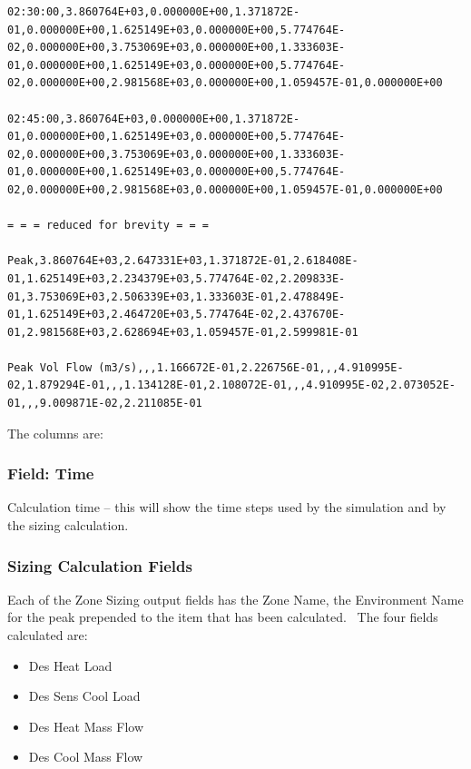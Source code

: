 \begin{lstlisting}
02:30:00,3.860764E+03,0.000000E+00,1.371872E-01,0.000000E+00,1.625149E+03,0.000000E+00,5.774764E-02,0.000000E+00,3.753069E+03,0.000000E+00,1.333603E-01,0.000000E+00,1.625149E+03,0.000000E+00,5.774764E-02,0.000000E+00,2.981568E+03,0.000000E+00,1.059457E-01,0.000000E+00

02:45:00,3.860764E+03,0.000000E+00,1.371872E-01,0.000000E+00,1.625149E+03,0.000000E+00,5.774764E-02,0.000000E+00,3.753069E+03,0.000000E+00,1.333603E-01,0.000000E+00,1.625149E+03,0.000000E+00,5.774764E-02,0.000000E+00,2.981568E+03,0.000000E+00,1.059457E-01,0.000000E+00

= = = reduced for brevity = = =

Peak,3.860764E+03,2.647331E+03,1.371872E-01,2.618408E-01,1.625149E+03,2.234379E+03,5.774764E-02,2.209833E-01,3.753069E+03,2.506339E+03,1.333603E-01,2.478849E-01,1.625149E+03,2.464720E+03,5.774764E-02,2.437670E-01,2.981568E+03,2.628694E+03,1.059457E-01,2.599981E-01

Peak Vol Flow (m3/s),,,1.166672E-01,2.226756E-01,,,4.910995E-02,1.879294E-01,,,1.134128E-01,2.108072E-01,,,4.910995E-02,2.073052E-01,,,9.009871E-02,2.211085E-01
\end{lstlisting}

The columns are:

\subsubsection{Field: Time}\label{field-time-000}

Calculation time -- this will show the time steps used by the simulation and by the sizing calculation.

\subsubsection{Sizing Calculation Fields}\label{sizing-calculation-fields}

Each of the Zone Sizing output fields has the Zone Name, the Environment Name for the peak prepended to the item that has been calculated.~ The four fields calculated are:

\begin{itemize}
\item
  Des Heat Load
\item
  Des Sens Cool Load
\item
  Des Heat Mass Flow
\item
  Des Cool Mass Flow
\end{itemize}

